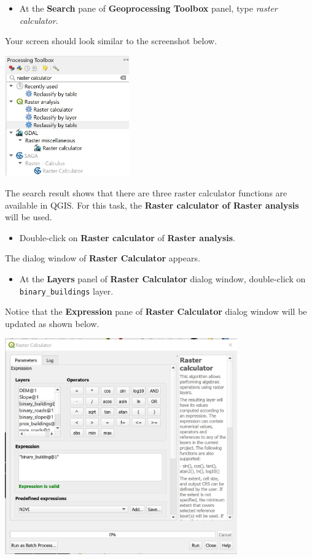 \documentclass[
  letterpaper,
  DIV=11,
  numbers=noendperiod]{scrreprt}
\providecommand{\tightlist}{%
  \setlength{\itemsep}{0pt}\setlength{\parskip}{0pt}}\usepackage{longtable,booktabs,array}
\begin{document}
\begin{itemize}
\tightlist
\item
  At the \textbf{Search} pane of \textbf{Geoprocessing Toolbox} panel,
  type \emph{raster calculator}.
\end{itemize}

Your screen should look similar to the screenshot below.

\includegraphics[width=0.4\textwidth,height=\textheight]{./img07/image40.jpg}

The search result shows that there are three raster calculator functions
are available in QGIS. For this task, the \textbf{Raster calculator of
Raster analysis} will be used.

\begin{itemize}
\tightlist
\item
  Double-click on \textbf{Raster calculator} of \textbf{Raster
  analysis}.
\end{itemize}

The dialog window of \textbf{Raster Calculator} appears.

\begin{itemize}
\tightlist
\item
  At the \textbf{Layers} panel of \textbf{Raster Calculator} dialog
  window, double-click on \texttt{binary\_buildings} layer.
\end{itemize}

Notice that the \textbf{Expression} pane of \textbf{Raster Calculator}
dialog window will be updated as shown below.

\includegraphics[width=0.75\textwidth,height=\textheight]{./img07/image41.jpg}
\end{document}
